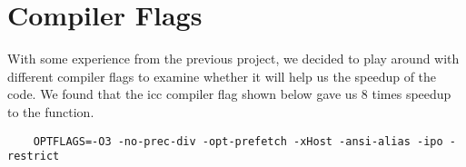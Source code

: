 \section{Compiler Flags}\label{compilerflags}
With some experience from the previous project, we decided to play around with different compiler flags to examine whether it will help us the speedup of the code. We found that the icc compiler flag shown below gave us 8 times speedup to the  function. 

\begin{verbatim}
	OPTFLAGS=-O3 -no-prec-div -opt-prefetch -xHost -ansi-alias -ipo -restrict
\end{verbatim}

